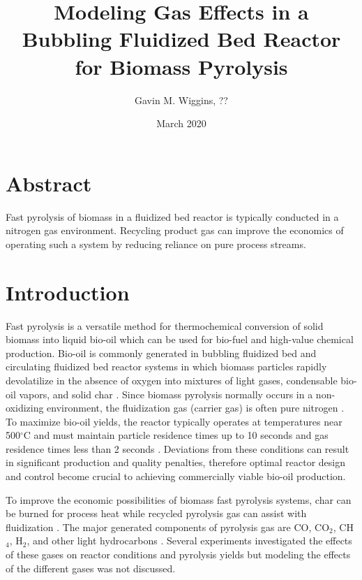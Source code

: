 \documentclass{article}
\title{Modeling Gas Effects in a Bubbling Fluidized Bed Reactor for Biomass Pyrolysis}
\author{Gavin M. Wiggins, ??}
\date{March 2020}
\begin{document}
\maketitle
\tableofcontents

\section*{Abstract}

Fast pyrolysis of biomass in a fluidized bed reactor is typically conducted in a nitrogen gas environment. Recycling product gas can improve the economics of operating such a system by reducing reliance on pure process streams.

\section{Introduction}

Fast pyrolysis is a versatile method for thermochemical conversion of solid biomass into liquid bio-oil which can be used for bio-fuel and high-value chemical production. Bio-oil is commonly generated in bubbling fluidized bed and circulating fluidized bed reactor systems in which biomass particles rapidly devolatilize in the absence of oxygen into mixtures of light gases, condensable bio-oil vapors, and solid char \cite{Bridgwater-1999, Bridgwater-2018a, Mohan-2006}. Since biomass pyrolysis normally occurs in a non-oxidizing environment, the fluidization gas (carrier gas) is often pure nitrogen \cite{Mohan-2006}. To maximize bio-oil yields, the reactor typically operates at temperatures near 500$^\circ$C and must maintain particle residence times up to 10 seconds and gas residence times less than 2 seconds \cite{Bridgwater-2018a}. Deviations from these conditions can result in significant production and quality penalties, therefore optimal reactor design and control become crucial to achieving commercially viable bio-oil production.

To improve the economic possibilities of biomass fast pyrolysis systems, char can be burned for process heat while recycled pyrolysis gas can assist with fluidization \cite{Bridgwater-1999, Mante-2012}. The major generated components of pyrolysis gas are CO, CO$_2$, CH$_4$, H$_2$, and other light hydrocarbons \cite{Asadullah-2008, Zhang-2011}. Several experiments investigated the effects of these gases on reactor conditions and pyrolysis yields \cite{Mante-2012, Mullen-2013, Zhang-2011} but modeling the effects of the different gases was not discussed.
\end{document}
